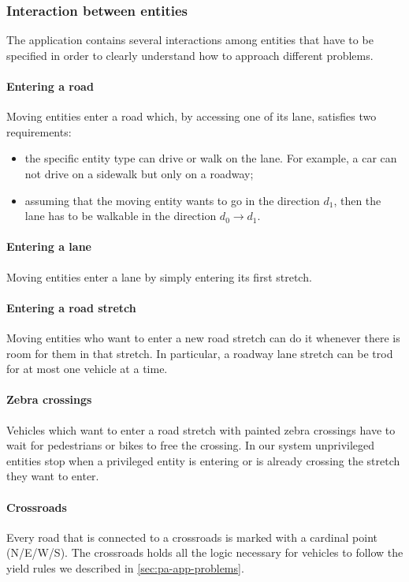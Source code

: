 \subsubsection{Interaction between entities}

The application contains several interactions among entities that have to be
specified in order to clearly understand how to approach different problems.

\paragraph{Entering a road} Moving entities enter a road which, by accessing
one of its lane, satisfies two requirements:

\begin{itemize}
  \item the specific entity type can drive or walk on the lane. For example,
  a car can not drive on a sidewalk but only on a roadway;
  \item assuming that the moving entity wants to go in the direction $d_1$,
    then the lane has to be walkable in the direction $d_0 \rightarrow d_1$.
\end{itemize}

\paragraph{Entering a lane}
Moving entities enter a lane by simply entering its first stretch.

\paragraph{Entering a road stretch}
Moving entities who want to enter a new road stretch can do it whenever there
is room for them in that stretch.
In particular, a roadway lane stretch can be trod for at most one vehicle at a
time.

\paragraph{Zebra crossings}
Vehicles which want to enter a road stretch with painted zebra crossings have
to wait for pedestrians or bikes to free the crossing.
In our system unprivileged entities stop when a privileged entity is entering
or is already crossing the stretch they want to enter.

\paragraph{Crossroads} Every road that is connected to a crossroads is marked
with a cardinal point (N/E/W/S). The crossroads holds all the logic necessary
for vehicles to follow the yield rules we described in
\ref{sec:pa-app-problems}.

